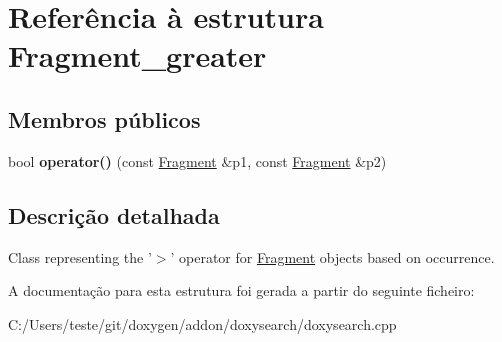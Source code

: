 \hypertarget{struct_fragment__greater}{\section{Referência à estrutura Fragment\-\_\-greater}
\label{struct_fragment__greater}
}
\subsection*{Membros públicos}
\begin{DoxyCompactItemize}
\item 
\hypertarget{struct_fragment__greater_acbe2c40778bd9c10141aea941662f50d}{bool {\bfseries operator()} (const \hyperlink{struct_fragment}{Fragment} \&p1, const \hyperlink{struct_fragment}{Fragment} \&p2)}\label{struct_fragment__greater_acbe2c40778bd9c10141aea941662f50d}

\end{DoxyCompactItemize}


\subsection{Descrição detalhada}
Class representing the '$>$' operator for \hyperlink{struct_fragment}{Fragment} objects based on occurrence. 

A documentação para esta estrutura foi gerada a partir do seguinte ficheiro\-:\begin{DoxyCompactItemize}
\item 
C\-:/\-Users/teste/git/doxygen/addon/doxysearch/doxysearch.\-cpp\end{DoxyCompactItemize}
